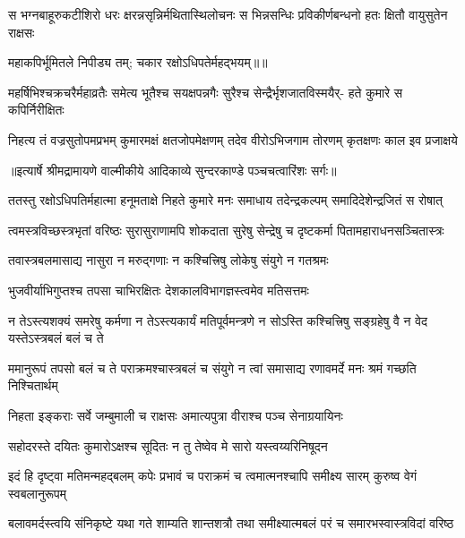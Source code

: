 \fourlineindentedshloka
{स भग्नबाहूरुकटीशिरो धरः}
{क्षरन्नसृन्निर्मथितास्थिलोचनः}
{स भिन्नसन्धिः प्रविकीर्णबन्धनो}
{हतः क्षितौ वायुसुतेन राक्षसः} %

{महाकपिर्भूमितले निपीड्य तम्; चकार रक्षोऽधिपतेर्महद्भयम्॥॥} %

\addtocounter{shlokacount}{1}

\fourlineindentedshloka
{महर्षिभिश्चक्रचरैर्महाव्रतैः}
{समेत्य भूतैश्च सयक्षपन्नगैः}
{सुरैश्च सेन्द्रैर्भृशजातविस्मयैर्-}
{हते कुमारे स कपिर्निरीक्षितः} %

\fourlineindentedshloka
{निहत्य तं वज्रसुतोपमप्रभम्}
{कुमारमक्षं क्षतजोपमेक्षणम्}
{तदेव वीरोऽभिजगाम तोरणम्}
{कृतक्षणः काल इव प्रजाक्षये} %


{॥इत्यार्षे श्रीमद्रामायणे वाल्मीकीये आदिकाव्ये सुन्दरकाण्डे पञ्चचत्वारिंशः सर्गः॥}


\fourlineindentedshloka
{ततस्तु रक्षोऽधिपतिर्महात्मा}
{हनूमताक्षे निहते कुमारे}
{मनः समाधाय तदेन्द्रकल्पम्}
{समादिदेशेन्द्रजितं स रोषात्} %

\fourlineindentedshloka
{त्वमस्त्रविच्छस्त्रभृतां वरिष्ठः}
{सुरासुराणामपि शोकदाता}
{सुरेषु सेन्द्रेषु च दृष्टकर्मा}
{पितामहाराधनसञ्चितास्त्रः} %

\twolineshloka
{तवास्त्रबलमासाद्य नासुरा न मरुद्गणाः}
{न कश्चित्त्रिषु लोकेषु संयुगे न गतश्रमः} %

\twolineshloka
{भुजवीर्याभिगुप्तश्च तपसा चाभिरक्षितः}
{देशकालविभागज्ञस्त्वमेव मतिसत्तमः} %

\fourlineindentedshloka
{न तेऽस्त्यशक्यं समरेषु कर्मणा}
{न तेऽस्त्यकार्यं मतिपूर्वमन्त्रणे}
{न सोऽस्ति कश्चित्त्रिषु सङ्ग्रहेषु वै}
{न वेद यस्तेऽस्त्रबलं बलं च ते} %

\fourlineindentedshloka
{ममानुरूपं तपसो बलं च ते}
{पराक्रमश्चास्त्रबलं च संयुगे}
{न त्वां समासाद्य रणावमर्दे}
{मनः श्रमं गच्छति निश्चितार्थम्} %

\twolineshloka
{निहता इङ्कराः सर्वे जम्बुमाली च राक्षसः}
{अमात्यपुत्रा वीराश्च पञ्च सेनाग्रयायिनः} %

\twolineshloka
{सहोदरस्ते दयितः कुमारोऽक्षश्च सूदितः}
{न तु तेष्वेव मे सारो यस्त्वय्यरिनिषूदन} %

\fourlineindentedshloka
{इदं हि दृष्ट्वा मतिमन्महद्बलम्}
{कपेः प्रभावं च पराक्रमं च}
{त्वमात्मनश्चापि समीक्ष्य सारम्}
{कुरुष्व वेगं स्वबलानुरूपम्} %

\fourlineindentedshloka
{बलावमर्दस्त्वयि संनिकृष्टे}
{यथा गते शाम्यति शान्तशत्रौ}
{तथा समीक्ष्यात्मबलं परं च}
{समारभस्वास्त्रविदां वरिष्ठ} %

